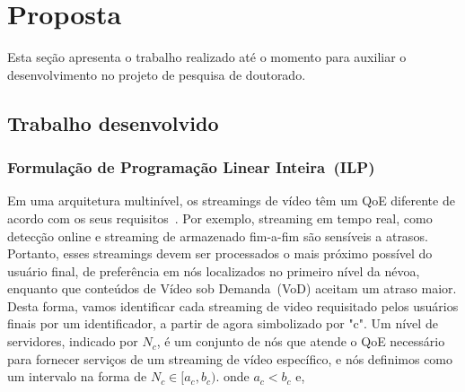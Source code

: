 \clearpage
\section{Proposta}
\label{ch:developed}

Esta seção apresenta o trabalho realizado até o momento para auxiliar o desenvolvimento 
no projeto de pesquisa de doutorado. 



%


\subsection{Trabalho desenvolvido}
\label{subsec:applications}


\subsubsection{Formulação de Programação Linear Inteira~(ILP)}
\label{subsec:applications}

Em uma arquitetura multinível, os streamings de vídeo têm um QoE diferente de acordo com os seus requisitos~\cite{judyLATINCOM2017}. Por exemplo, streaming em tempo real, como detecção online e streaming de armazenado fim-a-fim são sensíveis a atrasos. Portanto, esses streamings devem ser processados o mais próximo possível do usuário final, de preferência em nós localizados no primeiro nível da névoa, enquanto que conteúdos de Vídeo sob Demanda~(VoD) aceitam um atraso maior. Desta forma, vamos identificar cada streaming de video requisitado pelos usuários finais por um identificador, a partir de agora simbolizado por "c".
Um nível de servidores, indicado por $N_{c}$, é um conjunto de nós que atende o QoE necessário para fornecer serviços de um streaming de vídeo específico, e nós definimos como um intervalo na forma de $N_{c} \in [a_{c}, b_{c})$. onde $a_{c} < b_{c}$ e,


